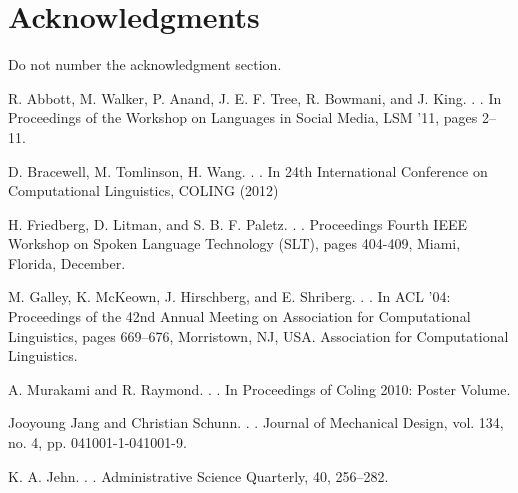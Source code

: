 \documentclass[11pt,letterpaper]{article}
\begin{document}
\section*{Acknowledgments}

Do not number the acknowledgment section.

\begin{thebibliography}{}
R. Abbott, M. Walker, P. Anand, J. E. F. Tree, R. Bowmani, and J. King.
. 
. 
\newblock In Proceedings of the Workshop on Languages in Social Media, LSM ’11, pages 2–11.

D. Bracewell, M. Tomlinson, H. Wang.
. 
. 
\newblock In 24th International Conference on Computational Linguistics, COLING (2012)

H. Friedberg, D. Litman, and S. B. F. Paletz.
. 
. 
\newblock Proceedings Fourth IEEE Workshop on Spoken Language Technology (SLT), pages 404-409, Miami, Florida, December.

M. Galley, K. McKeown, J. Hirschberg, and E. Shriberg.
. 
. 
\newblock In ACL ’04: Proceedings of the 42nd Annual Meeting on Association for Computational Linguistics, pages 669–676, Morristown, NJ, USA. Association for Computational Linguistics.

A. Murakami and R. Raymond.
. 
. 
\newblock In Proceedings of Coling 2010: Poster Volume.

Jooyoung Jang and Christian Schunn.
.
.
\newblock Journal of Mechanical Design, vol. 134, no. 4, pp. 041001-1-041001-9.

K. A. Jehn.
. 
. 
\newblock Administrative Science Quarterly, 40, 256–282.


\end{thebibliography}
\end{document}
